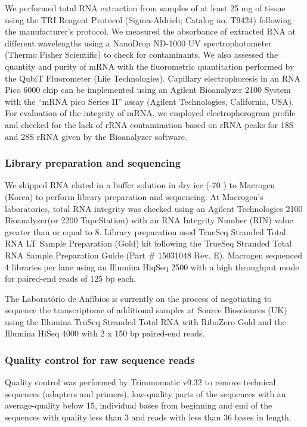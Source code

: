 We performed total RNA extraction from samples of at least 25 mg of tissue using the TRI Reagent Protocol (Sigma-Aldrich; Catalog no. T9424) following the manufacturer’s protocol. We measured the absorbance of extracted RNA at different wavelengths using a NanoDrop ND-1000 UV spectrophotometer (Thermo Fisher Scientific) to check for contaminants. We also assessed the quantity and purity of mRNA with the fluorometric quantitation performed by the QubiT Fluorometer (Life Technologies). Capillary electrophoresis in an RNA Pico 6000 chip can be implemented using an Agilent Bioanalyzer 2100 System with the ``mRNA pico Series II'' assay (Agilent Technologies, California, USA). For evaluation of the integrity of mRNA, we employed electropherogram profile and checked for the lack of rRNA contamination based on rRNA peaks for 18S and 28S rRNA given by the Bioanalyzer software.

\subsubsection{Library preparation and sequencing}

We shipped RNA eluted in a buffer solution in dry ice (-70 \celsius) to Macrogen (Korea) to perform library preparation and sequencing. At Macrogen’s laboratories, total RNA integrity was checked using an Agilent Technologies 2100 Bioanalyzer(or 2200 TapeStation) with an RNA Integrity Number (RIN) value greater than or equal to 8. Library preparation used TrueSeq Stranded Total RNA LT Sample Preparation (Gold) kit following the TrueSeq Stranded Total RNA Sample Preparation Guide (Part \# 15031048 Rev. E). Macrogen sequenced 4 libraries per lane using an Illumina HiqSeq 2500 with a high throughput mode for paired-end reads of 125 bp each.

The Laboratório de Anfíbios is currently on the process of negotiating to sequence the transcriptome of additional samples at Source Biosciences (UK) using the Illumina TruSeq Stranded Total RNA with RiboZero Gold and the Illumina HiSeq 4000 with 2 x 150 bp paired-end reads.

\subsubsection{Quality control for raw sequence reads}

Quality control was performed by Trimmomatic v0.32 \citep{bolger2014trimmomatic} to remove technical sequences (adapters and primers), low-quality parts of the sequences with an average-quality below 15, individual bases from beginning and end of the sequences with quality less than 3 and reads with less than 36 bases in length.

